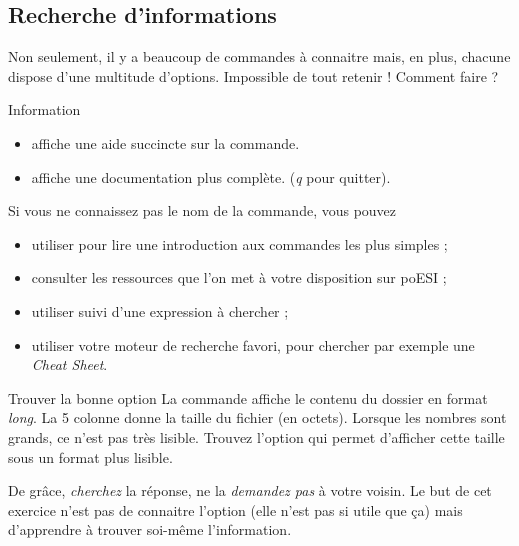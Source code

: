 \documentclass[a4paper,11pt]{style-esi/td}
\begin{document}
	\subsection{Recherche d'informations}  

		Non seulement, il y a beaucoup de commandes à connaitre mais, en plus, 
		chacune dispose d'une multitude d'options. 
		Impossible de tout retenir ! Comment faire ?   

		\begin{theorie}{Information}
			\begin{itemize}
			\item 
				affiche une aide succincte sur la commande.
			\item 
				 affiche une documentation plus complète.
				(\textit{q} pour quitter).
			\end{itemize}
		\end{theorie}

		Si vous ne connaissez pas le nom de la commande, vous pouvez
                \begin{itemize}
                \item utiliser  pour lire une introduction aux commandes les plus simples ;
                \item consulter les ressources que l'on met à votre disposition sur poESI ;
                \item utiliser  suivi d'une expression à chercher ;
                \item utiliser votre moteur de recherche favori, pour chercher par exemple une \textit{ Cheat Sheet}.
                \end{itemize}
		\begin{Exercice}{Trouver la bonne option} 
			La commande  
			affiche le contenu du dossier en format \textit{long}.
			La 5\ieme{} colonne donne la taille du fichier (en octets).
			Lorsque les nombres sont grands, ce n'est pas très lisible. 
			Trouvez l'option qui permet d'afficher cette taille sous un format plus lisible.  
			
			\begin{alertbox} 
				De grâce, \emph{cherchez} la réponse, 
				ne la \emph{demandez pas} à votre voisin. 
				Le but de cet exercice n'est pas de connaitre l'option 
				(elle n'est pas si utile que \c ca) 
				mais d'apprendre à trouver soi-même l'information.  
			\end{alertbox}
		\end{Exercice}
\end{document}

